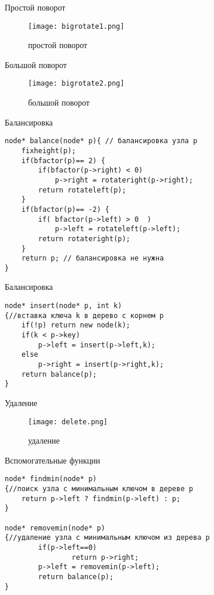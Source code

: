 \documentclass{beamer}
\begin{document}
\begin{frame}{Простой поворот}
    \begin{figure}
        \texttt{[image: bigrotate1.png]}
        \caption{простой поворот}
    \end{figure}
\end{frame}

\begin{frame}{Большой поворот}
    \begin{figure}
        \texttt{[image: bigrotate2.png]}
        \caption{большой поворот}
    \end{figure}
\end{frame}

\begin{frame}[fragile]{Балансировка}
    \begin{small}
        \begin{verbatim}
node* balance(node* p){ // балансировка узла p
    fixheight(p);
    if(bfactor(p)== 2) {
        if(bfactor(p->right) < 0)
            p->right = rotateright(p->right);
        return rotateleft(p);
    }
    if(bfactor(p)== -2) {
        if( bfactor(p->left) > 0  )
            p->left = rotateleft(p->left);
        return rotateright(p);
    }
    return p; // балансировка не нужна
}
    \end{verbatim}
    \end{small}
\end{frame}

\begin{frame}[fragile]{Балансировка}
    \begin{verbatim}
node* insert(node* p, int k) 
{//вставка ключа k в дерево с корнем p
    if(!p) return new node(k);
    if(k < p->key)
        p->left = insert(p->left,k);
    else
        p->right = insert(p->right,k);
    return balance(p);
}
    \end{verbatim}
\end{frame}

\begin{frame}{Удаление}
    \begin{figure}
        \texttt{[image: delete.png]}
        \caption{удаление}
    \end{figure}
\end{frame}

\begin{frame}[fragile]{Вспомогательные функции}
    \begin{verbatim}
node* findmin(node* p) 
{//поиск узла с минимальным ключом в дереве p 
    return p->left ? findmin(p->left) : p;
}

node* removemin(node* p) 
{//удаление узла с минимальным ключом из дерева p
	    if(p->left==0)
		        return p->right;
	    p->left = removemin(p->left);
	    return balance(p);
}
    \end{verbatim}
\end{frame}
\end{document}
